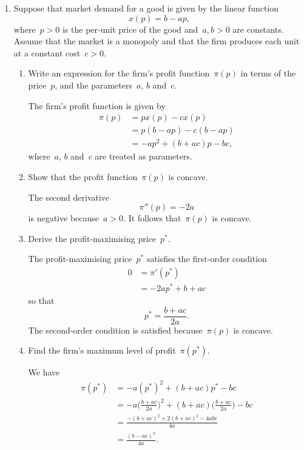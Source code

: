 
\begin{enumerate}

	\item
	Suppose that market demand for a good is given by the linear function
	\[ x(p)=b-ap, \]
	where~$p>0$ is the per-unit price of the good and~$a,b>0$ are constants.
	Assume that the market is a monopoly and that the firm produces each unit at a constant cost~$c>0$.
	\begin{enumerate}

		\item
		Write an expression for the firm's profit function~$\pi(p)$ in terms of the price~$p$, and the parameters~$a$, $b$ and~$c$.
		\begin{solution}
			The firm's profit function is given by
			\begin{align}
				\pi(p)
				&= px(p)-cx(p)\\
				&= p(b-ap)-c(b-ap)\\
				&= -ap^2+(b+ac)p-bc,
			\end{align}
			where~$a$, $b$ and~$c$ are treated as parameters.
		\end{solution}

		\item
		Show that the profit function~$\pi(p)$ is concave.
		\begin{solution}
			The second derivative
			\[ \pi''(p)=-2a \]
			is negative because~$a>0$.
			It follows that~$\pi(p)$ is concave.
		\end{solution}

		\item
		Derive the profit-maximising price~$p^*$.
		\begin{solution}
			The profit-maximising price~$p^*$ satisfies the first-order condition
			\begin{align}
				0
				&= \pi'(p^*)\\
				&= -2ap^*+b+ac
			\end{align}
			so that
			\[ p^*=\frac{b+ac}{2a}. \]
			The second-order condition is satisfied because~$\pi(p)$ is concave.
		\end{solution}

		\item
		Find the firm's maximum level of profit~$\pi(p^*)$.
		\begin{solution}
			We have
			\begin{align}
				\pi(p^*)
				&= -a(p^*)^2+(b+ac)p^*-bc\\
				&= -a\bigg(\frac{b+ac}{2a}\bigg)^2%
					+(b+ac)\bigg(\frac{b+ac}{2a}\bigg)%
					-bc\\
				&= \frac{-(b+ac)^2+2(b+ac)^2-4abc}{4a}\\
				&= \frac{(b-ac)^2}{4a}.
			\end{align}
		\end{solution}


\end{enumerate}
\end{enumerate}

